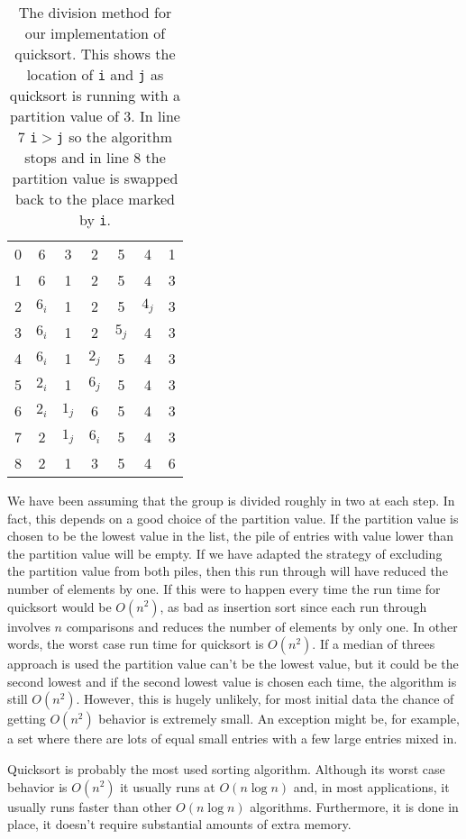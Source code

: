 \documentclass[11pt,a4paper]{scrartcl}
\begin{document}
\begin{table}
\begin{tabular}{c|cccccc}
0&6&3&2&5&4&1\\
1&6&1&2&5&4&3\\
2&$6_i$&1&2&5&$4_j$&3\\
3&$6_i$&1&2&$5_j$&4&3\\
4&$6_i$&1&$2_j$&5&4&3\\
5&$2_i$&1&$6_j$&5&4&3\\
6&$2_i$&$1_j$&6&5&4&3\\
7&2&$1_j$&$6_i$&5&4&3\\
8&2&1&3&5&4&6
\end{tabular}
\caption{The division method for our implementation of quicksort. This
  shows the location of \texttt{i} and \texttt{j} as quicksort is running with a partition value of 3. In line 7 \texttt{i}$>$\texttt{j}
  so the algorithm stops and in line 8 the partition value is swapped
  back to the place marked by \texttt{i}.\label{table_quick_careful}}
\end{table}

We have been assuming that the group is divided roughly in two at each
step. In fact, this depends on a good choice of the partition
value. If the partition value is chosen to be the lowest value in the
list, the pile of entries with value lower than the partition value
will be empty. If we have adapted the strategy of excluding the
partition value from both piles, then this run through will have
reduced the number of elements by one. If this were to happen every
time the run time for quicksort would be $O(n^2)$, as bad as insertion
sort since each run through involves $n$ comparisons and reduces the
number of elements by only one. In other words, the worst case run
time for quicksort is $O(n^2)$. If a median of threes approach is used
the partition value can't be the lowest value, but it could be the
second lowest and if the second lowest value is chosen each time, the
algorithm is still $O(n^2)$. However, this is hugely unlikely, for
most initial data the chance of getting $O(n^2)$ behavior is extremely
small. An exception might be, for example, a set where there are lots
of equal small entries with a few large entries mixed in.

Quicksort is probably the most used sorting algorithm. Although its
worst case behavior is $O(n^2)$ it usually runs at $O(n\log{n})$ and,
in most applications, it usually runs faster than other $O(n\log{n})$
algorithms. Furthermore, it is done in place, it doesn't require
substantial amounts of extra memory.
\end{document}
